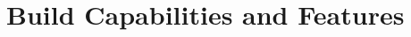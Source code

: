 \documentclass[pdf,ps2pdf,11pt]{SANDreport}
\begin{document}

%
\setcounter{secnumdepth}{3}
\SANDmain %


%
\section{Build Capabilities and Features}
%
\end{document}
